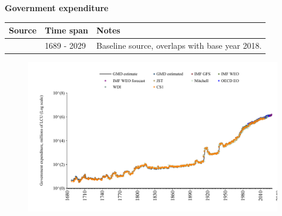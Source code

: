 \documentclass[12pt,a4paper,landscape]{article}
\begin{document}
\begin{adjustbox}{max totalsize={\paperwidth}{\paperheight},center}
\begin{minipage}[t][\textheight][t]{\textwidth}
\vspace*{0.5cm}
{}
\begin{center}
{\Large\bfseries Government expenditure}
\end{center}
\vspace{0.5cm}
\begin{table}[H]
\centering
\small
\begin{tabular}{|l|l|l|}
\hline
\textbf{Source} & \textbf{Time span} & \textbf{Notes} \\
\hline
\rowcolor{white}\cite{GMD_estimated}& 1689 - 2029 &Baseline source, overlaps with base year 2018. \\
\hline
\end{tabular}
\end{table}
\begin{figure}[H]
\centering
\includegraphics[width=\textwidth,height=0.6\textheight,keepaspectratio]{graphs/GBR_govexp.pdf}
\end{figure}
\end{minipage}
\end{adjustbox}
\end{document}
